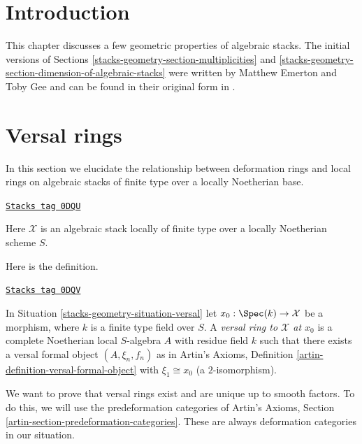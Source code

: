 \section{Introduction}
\label{stacks-geometry-section-introduction}
This chapter discusses a few geometric properties of algebraic stacks.
The initial versions of Sections \ref{stacks-geometry-section-multiplicities} and
\ref{stacks-geometry-section-dimension-of-algebraic-stacks}
were written by Matthew Emerton and Toby Gee and can be found
in their original form in \cite{Emerton-Gee-dim}.

\section{Versal rings}
\label{stacks-geometry-section-versal}
In this section we elucidate the relationship between deformation rings
and local rings on algebraic stacks of finite type over a locally
Noetherian base.

\begin{definition}
\label{stacks-geometry-situation-versal}
\href{https://stacks.math.columbia.edu/tag/0DQU}{\texttt{Stacks tag 0DQU}}

Here $\mathcal{X}$ is an algebraic stack locally of finite type
over a locally Noetherian scheme $S$.
\end{definition}

Here is the definition.

\begin{definition}
\label{stacks-geometry-definition-versal-ring-at-x}
\href{https://stacks.math.columbia.edu/tag/0DQV}{\texttt{Stacks tag 0DQV}}

In Situation \ref{stacks-geometry-situation-versal} let $x_0 : \Spec(k) \to \mathcal{X}$
be a morphism, where $k$ is a finite type field over $S$.
A {\it versal ring to $\mathcal{X}$ at $x_0$} is a complete
Noetherian local $S$-algebra $A$ with residue field $k$
such that there exists a versal formal object
$(A, \xi_n, f_n)$ as in Artin's Axioms, Definition
\ref{artin-definition-versal-formal-object}
with $\xi_1 \cong x_0$ (a $2$-isomorphism).
\end{definition}

We want to prove that versal rings exist and are unique up to
smooth factors. To do this, we will use the predeformation categories of
Artin's Axioms, Section \ref{artin-section-predeformation-categories}.
These are always deformation categories in our situation.

